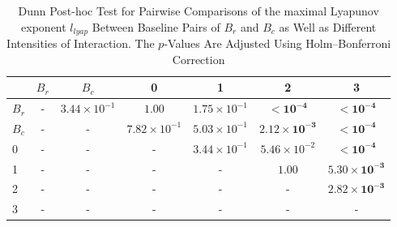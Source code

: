 \begin{table*}[!t]
\caption{Dunn Post-hoc Test for Pairwise Comparisons of the maximal Lyapunov exponent $l_{lyap}$ Between Baseline Pairs of $B_r$ and $B_c$ as Well as Different Intensities of Interaction. The $p$-Values Are Adjusted Using Holm--Bonferroni Correction\label{tab:dunn_lyapunov}}
\centering
\begin{tabular}{lcccccc}
\toprule
 & $B_r$ & $B_c$ & 0 & 1 & 2 & 3 \\
\midrule
$B_r$ & - & $3.44 \times 10^{-1}$ & $1.00$ & $1.75 \times 10^{-1}$ & $\mathbf{< 10^{-4}}$ & $\mathbf{< 10^{-4}}$ \\
$B_c$ & - & - & $7.82 \times 10^{-1}$ & $5.03 \times 10^{-1}$ & $\mathbf{2.12 \times 10^{-3}}$ & $\mathbf{< 10^{-4}}$ \\
0 & - & - & - & $3.44 \times 10^{-1}$ & $5.46 \times 10^{-2}$ & $\mathbf{< 10^{-4}}$ \\
1 & - & - & - & - & $1.00$ & $\mathbf{5.30 \times 10^{-3}}$ \\
2 & - & - & - & - & - & $\mathbf{2.82 \times 10^{-3}}$ \\
3 & - & - & - & - & - & - \\
\bottomrule
\end{tabular}
\end{table*}
